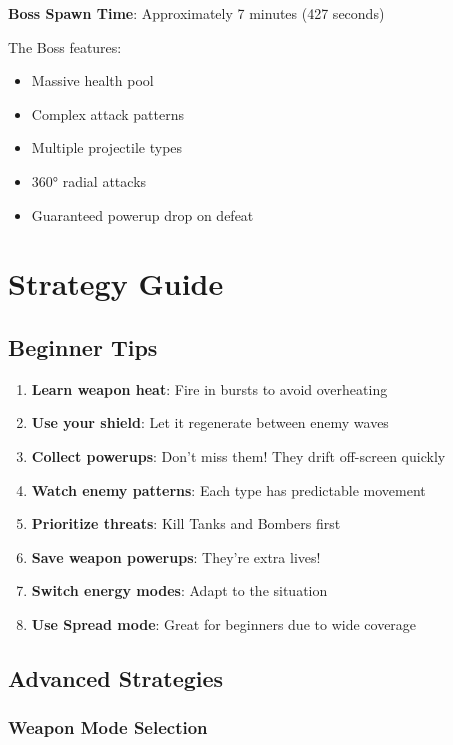 \documentclass[11pt,a4paper]{article}
\begin{document}
\textbf{Boss Spawn Time}: Approximately 7 minutes (427 seconds)

The Boss features:
\begin{itemize}[nosep]
    \item Massive health pool
    \item Complex attack patterns
    \item Multiple projectile types
    \item 360° radial attacks
    \item Guaranteed powerup drop on defeat
\end{itemize}

\section{Strategy Guide}

\subsection{Beginner Tips}

\begin{enumerate}[leftmargin=*]
    \item \textbf{Learn weapon heat}: Fire in bursts to avoid overheating
    \item \textbf{Use your shield}: Let it regenerate between enemy waves
    \item \textbf{Collect powerups}: Don't miss them! They drift off-screen quickly
    \item \textbf{Watch enemy patterns}: Each type has predictable movement
    \item \textbf{Prioritize threats}: Kill Tanks and Bombers first
    \item \textbf{Save weapon powerups}: They're extra lives!
    \item \textbf{Switch energy modes}: Adapt to the situation
    \item \textbf{Use Spread mode}: Great for beginners due to wide coverage
\end{enumerate}

\subsection{Advanced Strategies}

\subsubsection{Weapon Mode Selection}
\end{document}
